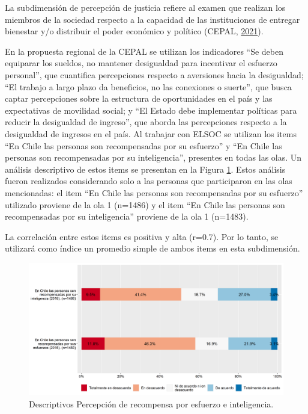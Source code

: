 \documentclass[
  12pt,
]{book}
\begin{document}
La subdimensión de percepción de justicia refiere al examen que realizan los miembros de la sociedad respecto a la capacidad de las instituciones de entregar bienestar y/o distribuir el poder económico y político (CEPAL, \protect\hyperlink{ref-cepal_cohesion_2021}{2021}).

En la propuesta regional de la CEPAL se utilizan los indicadores ``Se deben equiparar los sueldos, no mantener desigualdad para incentivar el esfuerzo personal'', que cuantifica percepciones respecto a aversiones hacia la desigualdad; ``El trabajo a largo plazo da beneficios, no las conexiones o suerte'', que busca captar percepciones sobre la estructura de oportunidades en el país y las expectativas de movilidad social; y ``El Estado debe implementar políticas para reducir la desigualdad de ingreso'', que aborda las percepciones respecto a la desigualdad de ingresos en el país. Al trabajar con ELSOC se utilizan los items ``En Chile las personas son recompensadas por su esfuerzo'' y ``En Chile las personas son recompensadas por su inteligencia'', presentes en todas las olas. Un análisis descriptivo de estos items se presentan en la Figura \ref{fig:justicia}. Estos análisis fueron realizados considerando solo a las personas que participaron en las olas mencionadas: el item ``En Chile las personas son recompensadas por su esfuerzo'' utilizado proviene de la ola 1 (n=1486) y el item ``En Chile las personas son recompensadas por su inteligencia'' proviene de la ola 1 (n=1483).

La correlación entre estos items es positiva y alta (r=0.7). Por lo tanto, se utilizará como índice un promedio simple de ambos items en esta subdimensión.

\begin{figure}[H]

{\centering \includegraphics[width=1\linewidth,height=1\textheight]{output/graphs/justicia} 

}

\caption{Descriptivos Percepción de recompensa por esfuerzo e inteligencia.}\label{fig:justicia}
\end{figure}
\end{document}
